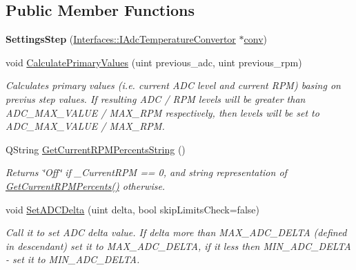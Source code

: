 \subsection*{Public Member Functions}
\begin{DoxyCompactItemize}
\item 
\mbox{\label{class_settings_step_a650844d8164741ba04f153d7d6be1261}} 
{\bfseries Settings\+Step} (\hyperlink{class_interfaces_1_1_i_adc_temperature_convertor}{Interfaces\+::\+I\+Adc\+Temperature\+Convertor} $\ast$\hyperlink{class_interfaces_1_1_i_settings_step_a5db60ca3f2c1b4e7059910e2d86656b9}{conv})
\item 
void \hyperlink{class_settings_step_ac6f79a139ab25cc50ed105f64fc9652f}{Calculate\+Primary\+Values} (uint previous\+\_\+adc, uint previous\+\_\+rpm)
\begin{DoxyCompactList}\small\item\em Calculates primary values (i.\+e. current A\+DC level and current R\+PM) basing on previus step values. If resulting A\+DC / R\+PM levels will be greater than A\+D\+C\+\_\+\+M\+A\+X\+\_\+\+V\+A\+L\+UE / M\+A\+X\+\_\+\+R\+PM respectively, then levels will be set to A\+D\+C\+\_\+\+M\+A\+X\+\_\+\+V\+A\+L\+UE / M\+A\+X\+\_\+\+R\+PM. \end{DoxyCompactList}\item 
Q\+String \hyperlink{class_settings_step_a21e452401e180d6e114561a8b05ab1ae}{Get\+Current\+R\+P\+M\+Percents\+String} ()
\begin{DoxyCompactList}\small\item\em Returns \char`\"{}\+Off\char`\"{} if \+\_\+\+Current\+R\+PM == 0, and string representation of \hyperlink{class_settings_step_a35bea9115637a0c848e8f827f2353c11}{Get\+Current\+R\+P\+M\+Percents()} otherwise. \end{DoxyCompactList}\item 
void \hyperlink{class_settings_step_a8124c87ae0b1d9fb3b623144d0e492db}{Set\+A\+D\+C\+Delta} (uint delta, bool skip\+Limits\+Check=false)
\begin{DoxyCompactList}\small\item\em Call it to set A\+DC delta value. If delta more than M\+A\+X\+\_\+\+A\+D\+C\+\_\+\+D\+E\+L\+TA (defined in descendant) set it to M\+A\+X\+\_\+\+A\+D\+C\+\_\+\+D\+E\+L\+TA, if it less then M\+I\+N\+\_\+\+A\+D\+C\+\_\+\+D\+E\+L\+TA -\/ set it to M\+I\+N\+\_\+\+A\+D\+C\+\_\+\+D\+E\+L\+TA. \end{DoxyCompactList}\item 

\end{DoxyCompactItemize}

